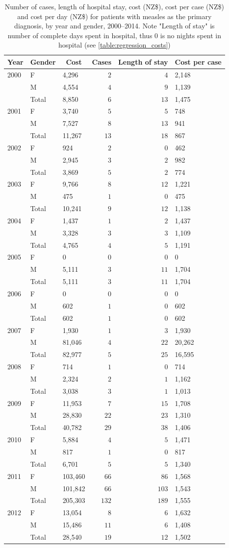 \documentclass{article}
\begin{document}
\begin{table}\footnotesize
\caption{Number of cases, length of hospital stay, cost (NZ\$), cost per case (NZ\$) and cost per day (NZ\$) for patients with measles as the primary diagnosis, by year and gender, 2000--2014. Note "Length of stay" is number of complete days spent in hospital, thus 0 is no nights spent in hospital (see \autoref{table:regression_costs})}
\begin{center}
\begin{tabular}{lllrrl}
\hline\hline
\multicolumn{1}{c}{Year}&\multicolumn{1}{c}{Gender}&\multicolumn{1}{c}{Cost}&\multicolumn{1}{c}{Cases}&\multicolumn{1}{c}{Length of stay}&\multicolumn{1}{c}{Cost per case}\tabularnewline
\hline
2000&F&4,296&$  2$&$  4$&2,148\tabularnewline
&M&4,554&$  4$&$  9$&1,139\tabularnewline
&Total&8,850&$  6$&$ 13$&1,475\tabularnewline
2001&F&3,740&$  5$&$  5$&748\tabularnewline
&M&7,527&$  8$&$ 13$&941\tabularnewline
&Total&11,267&$ 13$&$ 18$&867\tabularnewline
2002&F&924&$  2$&$  0$&462\tabularnewline
&M&2,945&$  3$&$  2$&982\tabularnewline
&Total&3,869&$  5$&$  2$&774\tabularnewline
2003&F&9,766&$  8$&$ 12$&1,221\tabularnewline
&M&475&$  1$&$  0$&475\tabularnewline
&Total&10,241&$  9$&$ 12$&1,138\tabularnewline
2004&F&1,437&$  1$&$  2$&1,437\tabularnewline
&M&3,328&$  3$&$  3$&1,109\tabularnewline
&Total&4,765&$  4$&$  5$&1,191\tabularnewline
2005&F&0&$  0$&$  0$&0\tabularnewline
&M&5,111&$  3$&$ 11$&1,704\tabularnewline
&Total&5,111&$  3$&$ 11$&1,704\tabularnewline
2006&F&0&$  0$&$  0$&0\tabularnewline
&M&602&$  1$&$  0$&602\tabularnewline
&Total&602&$  1$&$  0$&602\tabularnewline
2007&F&1,930&$  1$&$  3$&1,930\tabularnewline
&M&81,046&$  4$&$ 22$&20,262\tabularnewline
&Total&82,977&$  5$&$ 25$&16,595\tabularnewline
2008&F&714&$  1$&$  0$&714\tabularnewline
&M&2,324&$  2$&$  1$&1,162\tabularnewline
                    &Total&3,038&$  3$&$  1$&1,013\tabularnewline
2009&F&11,953&$  7$&$ 15$&1,708\tabularnewline
&M&28,830&$ 22$&$ 23$&1,310\tabularnewline
                    &Total&40,782&$ 29$&$ 38$&1,406\tabularnewline
2010&F&5,884&$  4$&$  5$&1,471\tabularnewline
&M&817&$  1$&$  0$&817\tabularnewline
                    &Total&6,701&$  5$&$  5$&1,340\tabularnewline
2011&F&103,460&$ 66$&$ 86$&1,568\tabularnewline
&M&101,842&$ 66$&$103$&1,543\tabularnewline
                    &Total&205,303&$132$&$189$&1,555\tabularnewline
2012&F&13,054&$  8$&$  6$&1,632\tabularnewline
&M&15,486&$ 11$&$  6$&1,408\tabularnewline
                    &Total&28,540&$ 19$&$ 12$&1,502\tabularnewline

\end{tabular}
\end{center}
\end{table}
\end{document}
